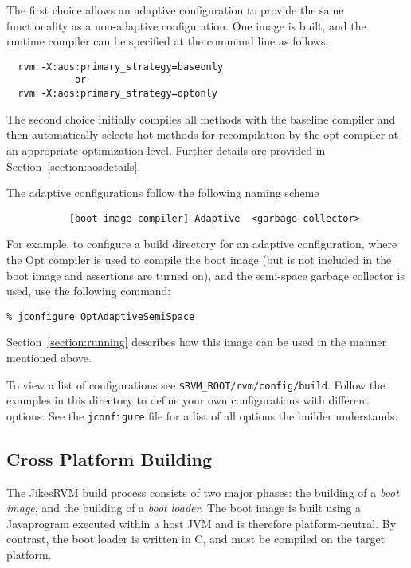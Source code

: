 The first choice allows an adaptive configuration to provide the same
functionality as a non-adaptive configuration.  One image is built,
and the runtime compiler can be specified at the command line as
follows:
\begin{verbatim}
  rvm -X:aos:primary_strategy=baseonly
            or
  rvm -X:aos:primary_strategy=optonly
\end{verbatim}

The second choice initially compiles all methods with the
baseline compiler and then automatically selects hot methods for
recompilation by the opt compiler at an appropriate optimization
level. Further details are provided in Section~\ref{section:aosdetails}.

The adaptive configurations follow the following naming scheme
\begin{verbatim}
           [boot image compiler] Adaptive  <garbage collector>
\end{verbatim}

For example, to configure a build 
directory for an adaptive configuration, where the Opt compiler is 
used to compile the boot image (but is not included in the boot image
and assertions are turned on), and the semi-space garbage collector is
used, use the following command:

\begin{verbatim}
% jconfigure OptAdaptiveSemiSpace
\end{verbatim}

Section~\ref{section:running} describes how this image can be used in
the manner mentioned above.

To view a list of configurations see 
{\tt \$RVM\_ROOT/rvm/config/build}.  Follow the examples in this
directory to define your own configurations with different options.  See
the {\tt jconfigure} file for a list of all options the builder
understands.

\JikesTMFooter

\subsection{Cross Platform Building}

The Jikes\trademark RVM build process consists of two major phases:
the building of a 
{\em boot image}, and the building of a {\em boot loader}.
The boot image is built using a Java\trademark program executed within a host
JVM and is therefore platform-neutral.  By contrast, the boot loader
is written in C, and must be compiled on the target platform.

